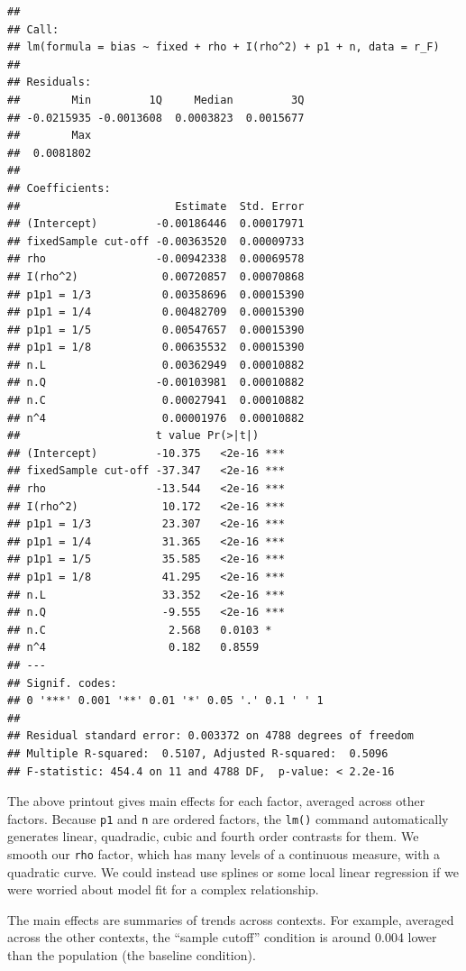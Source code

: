 \documentclass[
]{book}
\begin{document}
\begin{verbatim}
## 
## Call:
## lm(formula = bias ~ fixed + rho + I(rho^2) + p1 + n, data = r_F)
## 
## Residuals:
##        Min         1Q     Median         3Q 
## -0.0215935 -0.0013608  0.0003823  0.0015677 
##        Max 
##  0.0081802 
## 
## Coefficients:
##                        Estimate  Std. Error
## (Intercept)         -0.00186446  0.00017971
## fixedSample cut-off -0.00363520  0.00009733
## rho                 -0.00942338  0.00069578
## I(rho^2)             0.00720857  0.00070868
## p1p1 = 1/3           0.00358696  0.00015390
## p1p1 = 1/4           0.00482709  0.00015390
## p1p1 = 1/5           0.00547657  0.00015390
## p1p1 = 1/8           0.00635532  0.00015390
## n.L                  0.00362949  0.00010882
## n.Q                 -0.00103981  0.00010882
## n.C                  0.00027941  0.00010882
## n^4                  0.00001976  0.00010882
##                     t value Pr(>|t|)    
## (Intercept)         -10.375   <2e-16 ***
## fixedSample cut-off -37.347   <2e-16 ***
## rho                 -13.544   <2e-16 ***
## I(rho^2)             10.172   <2e-16 ***
## p1p1 = 1/3           23.307   <2e-16 ***
## p1p1 = 1/4           31.365   <2e-16 ***
## p1p1 = 1/5           35.585   <2e-16 ***
## p1p1 = 1/8           41.295   <2e-16 ***
## n.L                  33.352   <2e-16 ***
## n.Q                  -9.555   <2e-16 ***
## n.C                   2.568   0.0103 *  
## n^4                   0.182   0.8559    
## ---
## Signif. codes:  
## 0 '***' 0.001 '**' 0.01 '*' 0.05 '.' 0.1 ' ' 1
## 
## Residual standard error: 0.003372 on 4788 degrees of freedom
## Multiple R-squared:  0.5107, Adjusted R-squared:  0.5096 
## F-statistic: 454.4 on 11 and 4788 DF,  p-value: < 2.2e-16
\end{verbatim}

The above printout gives main effects for each factor, averaged across other factors.
Because \texttt{p1} and \texttt{n} are ordered factors, the \texttt{lm()} command automatically generates linear, quadradic, cubic and fourth order contrasts for them.
We smooth our \texttt{rho} factor, which has many levels of a continuous measure, with a quadratic curve.
We could instead use splines or some local linear regression if we were worried about model fit for a complex relationship.

The main effects are summaries of trends across contexts.
For example, averaged across the other contexts, the ``sample cutoff'' condition is around 0.004 lower than the population (the baseline condition).
\end{document}

